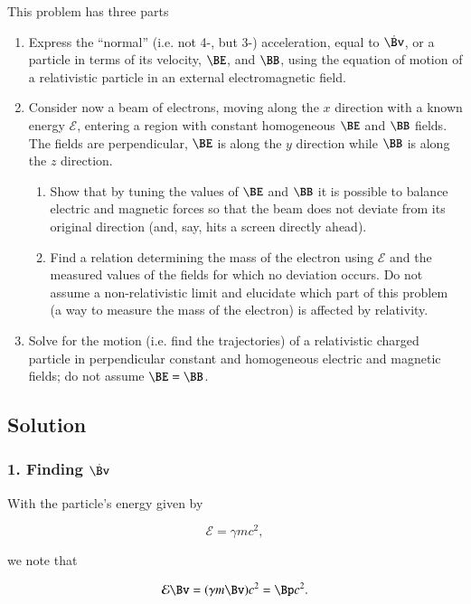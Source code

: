 This problem has three parts
\begin{enumerate}
\item Express the ``normal'' (i.e. not 4-, but 3-) acceleration, equal to $\dot{\Bv}$, or a particle in terms of its velocity, $\BE$, and $\BB$, using the equation of motion of a relativistic particle in an external electromagnetic field.
\item Consider now a beam of electrons, moving along the $x$ direction with a known energy $\mathcal{E}$, entering a region with constant homogeneous $\BE$ and $\BB$ fields.  The fields are perpendicular, $\BE$ is along the $y$ direction while $\BB$ is along the $z$ direction.
\begin{enumerate}
\item
Show that by tuning the values of $\BE$ and $\BB$ it is possible to balance electric and magnetic forces so that the beam does not deviate from its original direction (and, say, hits a screen directly ahead).
\item Find a relation determining the mass of the electron using $\mathcal{E}$ and the measured values of the fields for which no deviation occurs.  Do not assume a non-relativistic limit and elucidate which part of this problem (a way to measure the mass of the electron) is affected by relativity.
\end{enumerate}
\item Solve for the motion (i.e. find the trajectories) of a relativistic charged particle in perpendicular constant and homogeneous electric and magnetic fields; do not assume $\BE = \BB$.
\end{enumerate}
\subsection{Solution}
\subsubsection{1. Finding $\dot{\Bv}$}

With the particle's energy given by

\begin{equation}\label{eqn:relElectroDynProblemSet2:150}
\mathcal{E} = \gamma m c^2,
\end{equation}

we note that

\begin{equation}\label{eqn:relElectroDynProblemSet2:170}
\mathcal{E}\Bv = (\gamma m \Bv) c^2 = \Bp c^2.
\end{equation}

